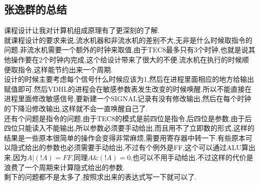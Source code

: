 \documentclass[UTF8]{ctexart}
\begin{document}
\subsection{张逸群的总结}
课程设计让我对计算机组成原理有了更深刻的了解.\\
\indent 就课程设计的要求来说,流水机器和非流水机的差别不大,无非是什么时候取指令的问题.非流水机需要一个额外的时钟来取值,由于TEC8最多只有3个时钟,也就是说其他操作要在2个时钟内完成,这个给设计带来了很大的不便.流水机在执行的时候顺便取指令,这样能节约出来一个周期.\\
\indent 设计的时候主要考虑每个信号什么时候应该为1,然后在进程里面相应的地方给输出赋值即可.然后VDHL的进程会在敏感参数表发生改变的时候唤醒.所以不能直接在进程里面修改敏感信号,要新建一个SIGNAL记录有没有修改输出,然后在每个时钟的下降沿修改输出,这样就不会一直唤醒自己了.\\
\indent 还有个问题是指令的问题,由于TEC8的模式是前四位是指令,后四位是参数,由于后四位只能读入不能输出,所以参数必须要手动给出,而且用不了立即数的形式,这样的结果是一些原本很简单的操作会变得非常麻烦,需要用寄存器中转一下.有些原本可以隐式给出的参数也必须需要手动给出,不过有个例外是FF,这个可以通过ALU算出来,因为$A|(!A)=FF$,同理$A\&(!A)=0$,也可以不用手动给出.不过这样的代价是浪费了一个周期来计算隐式给出的参数.\\
\indent 剩下的问题都不是太多了,按照求出来的表达式写一下就可以了.
\end{document}
